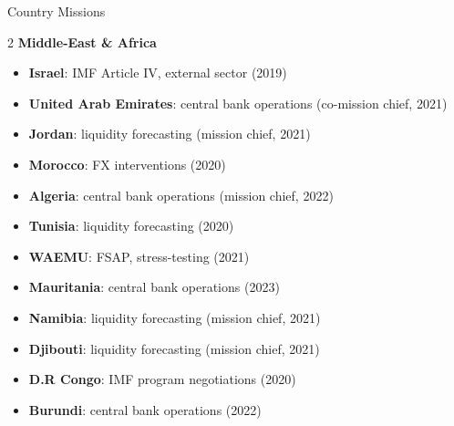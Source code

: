\documentclass[usegeometry, 10pt, a4paper]{cv} %
\begin{document}
\begin{rubriquetableau}[0.95\textwidth]{Country Missions}
\begin{multicols}{2}
  \textbf{\large Middle-East \&  Africa}
\begin{itemize}
  \item \textbf{Israel}: IMF Article IV, external sector (2019)
  \item \textbf{United Arab Emirates}: central bank operations (co-mission chief, 2021)
  \item \textbf{Jordan}: liquidity forecasting (mission chief, 2021)
  \item \textbf{Morocco}: FX interventions (2020)  
  \item \textbf{Algeria}: central bank operations (mission chief, 2022)
  \item \textbf{Tunisia}: liquidity forecasting (2020)
  \item \textbf{WAEMU}: FSAP, stress-testing (2021)
  \item \textbf{Mauritania}: central bank operations (2023)
  \item \textbf{Namibia}: liquidity forecasting (mission chief, 2021)
  \item \textbf{Djibouti}: liquidity forecasting (mission chief, 2021)
  \item \textbf{D.R Congo}: IMF program negotiations (2020)
  \item \textbf{Burundi}: central bank operations (2022)
\end{itemize}
\end{multicols}  
\end{rubriquetableau}
\vspace{0.5cm}
\end{document}
